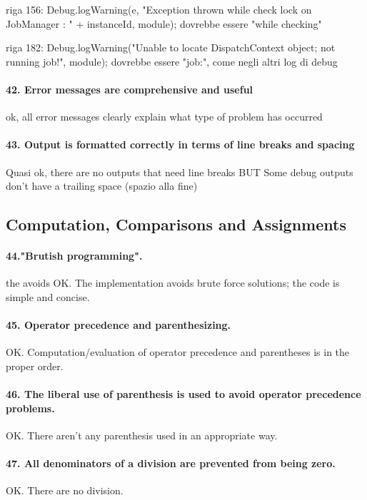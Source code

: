 \documentclass[english]{article}
\begin{document}
riga 156:
Debug.logWarning(e, "Exception thrown while check lock on JobManager : " + instanceId, module);
dovrebbe essere "while checking"

riga 182:
Debug.logWarning("Unable to locate DispatchContext object; not running job!", module);
dovrebbe essere "job:", come negli altri log di debug


\paragraph{42. Error messages are comprehensive and useful}
ok, all error messages clearly explain what type of problem has occurred

\paragraph{43. Output is formatted correctly in terms of line breaks and spacing}
Quasi ok, there are no outputs that need line breaks
BUT Some debug outputs don't have a trailing space (spazio alla fine)

\subsection{Computation, Comparisons and Assignments}
\paragraph{44."Brutish programming".}the  avoids
OK. The implementation avoids brute force solutions; the code is simple and concise.

\paragraph{45. Operator precedence and parenthesizing.}
OK. Computation/evaluation of operator precedence and parentheses is in the proper order.
 
\paragraph{46. The liberal use of parenthesis is used to avoid operator precedence problems.}
OK. There aren't any parenthesis used in an appropriate way.

\paragraph{47. All denominators of a division are prevented from being zero.}
OK. There are no division.
\end{document}
